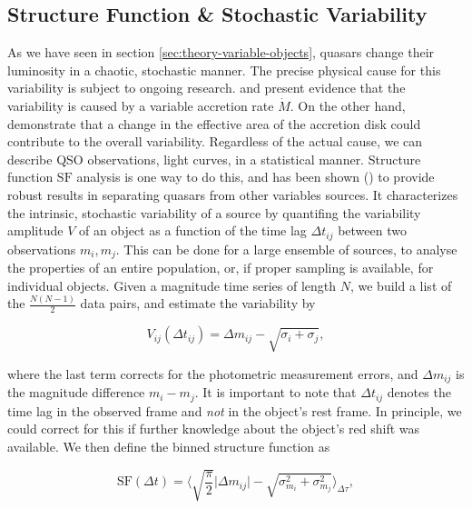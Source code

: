 
\subsection{Structure Function \& Stochastic Variability}
\label{subsec:structure-function}

As we have seen in section \ref{sec:theory-variable-objects}, quasars change their luminosity in a chaotic, stochastic manner. The precise physical cause for this variability is subject to ongoing research. \citet{pereyra2006} and \citet{li2008} present evidence that the variability is caused by a variable accretion rate $\dot M$. On the other hand, \citet{blackburne2010} demonstrate that a change in the effective area of the accretion disk could contribute to the overall variability. Regardless of the actual cause, we can describe QSO observations, \eg light curves, in a statistical manner. Structure function $\text{SF}$ analysis \citep{hughes1992,collier2001} is one way to do this, and has been shown (\eg \citet{schmidt2010}) to provide robust results in separating quasars from other variables sources. It characterizes the intrinsic, stochastic variability of a source by quantifing the variability amplitude $V$ of an object as a function of the time lag $\Delta t_{ij}$ between two observations $m_i, m_j$. This can be done for a large ensemble of sources, to analyse the properties of an entire population, or, if proper sampling is available, for individual objects. Given a magnitude time series of length $N$, we build a list of the $\frac{N(N-1)}{2}$ data pairs, and estimate the variability by

\begin{equation}
V_{ij}(\Delta t_{ij}) = \Delta m_{ij} - \sqrt{\sigma_i + \sigma_j},
\end{equation}

where the last term corrects for the photometric measurement errors, and $\Delta m_{ij}$ is the magnitude difference $m_i - m_j$. It is important to note that $\Delta t_{ij}$ denotes the time lag in the observed frame and \emph{not} in the object's rest frame. In principle, we could correct for this if further knowledge about the object's red shift was available. We then define the binned structure function as

\begin{equation}
\text{SF}(\Delta t) = \big\langle \sqrt{\frac{\pi}{2}} \big| \Delta m_{ij}  \big| - \sqrt{\sigma_{m_i}^2 + \sigma_{m_j}^2} \big\rangle_{\Delta \tau},
\label{eq:binned-structure-function}
\end{equation}


